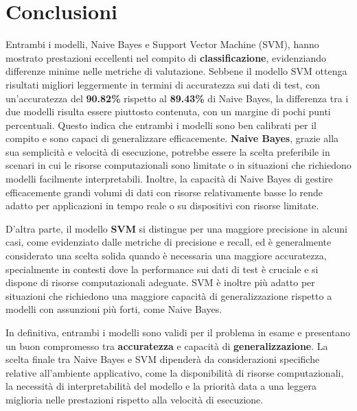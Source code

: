 \section{Conclusioni}

Entrambi i modelli, Naive Bayes e Support Vector Machine (SVM), hanno mostrato prestazioni eccellenti nel compito di \textbf{classificazione}, evidenziando differenze minime nelle metriche di valutazione. Sebbene il modello SVM ottenga risultati migliori leggermente in termini di accuratezza sui dati di test, con un'accuratezza del \textbf{90.82\%} rispetto al \textbf{89.43\%} di Naive Bayes, la differenza tra i due modelli risulta essere piuttosto contenuta, con un margine di pochi punti percentuali. Questo indica che entrambi i modelli sono ben calibrati per il compito e sono capaci di generalizzare efficacemente. \newline
\textbf{Naive Bayes}, grazie alla sua semplicità e velocità di esecuzione, potrebbe essere la scelta preferibile in scenari in cui le risorse computazionali sono limitate o in situazioni che richiedono modelli facilmente interpretabili. Inoltre, la capacità di Naive Bayes di gestire efficacemente grandi volumi di dati con risorse relativamente basse lo rende adatto per applicazioni in tempo reale o su dispositivi con risorse limitate.

D'altra parte, il modello \textbf{SVM} si distingue per una maggiore precisione in alcuni casi, come evidenziato dalle metriche di precisione e recall, ed è generalmente considerato una scelta solida quando è necessaria una maggiore accuratezza, specialmente in contesti dove la performance sui dati di test è cruciale e si dispone di risorse computazionali adeguate. SVM è inoltre più adatto per situazioni che richiedono una maggiore capacità di generalizzazione rispetto a modelli con assunzioni più forti, come Naive Bayes.

In definitiva, entrambi i modelli sono validi per il problema in esame e presentano un buon compromesso tra \textbf{accuratezza} e capacità di \textbf{generalizzazione}. La scelta finale tra Naive Bayes e SVM dipenderà da considerazioni specifiche relative all'ambiente applicativo, come la disponibilità di risorse computazionali, la necessità di interpretabilità del modello e la priorità data a una leggera miglioria nelle prestazioni rispetto alla velocità di esecuzione.